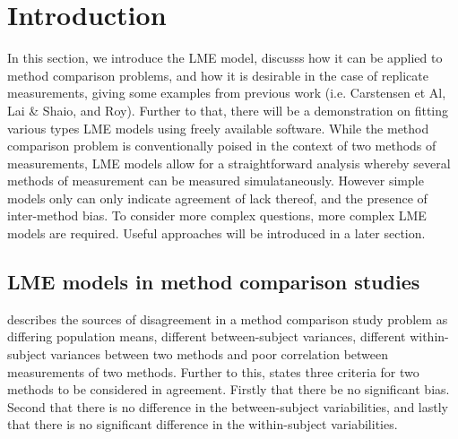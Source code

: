 \documentclass[12pt, a4paper]{report}
\theoremstyle{plain}
\theoremstyle{definition}
\theoremstyle{remark}
\begin{document}
	\newpage
	
	\section{Introduction}
	In this section, we introduce the LME model, discusss how it can be applied to method comparison problems, and how it is desirable in the case of replicate measurements, giving some examples from previous work (i.e. Carstensen et Al, Lai \& Shaio, and Roy). Further to that, there will be a demonstration on fitting various types LME models using freely available software.
	While the method comparison problem is conventionally poised in the context of two methods of measurements, LME models allow for a straightforward analysis whereby several methods of measurement can be measured simulataneously. However simple models only can only indicate agreement of lack thereof, and the presence of inter-method bias. To consider more complex questions, more complex LME models are required.  Useful approaches will be introduced in a later section.
	
	
	
	\subsection{LME models in method comparison studies}
	
	
	
	
	
	
	\citet{Barnhart} describes the sources of disagreement in a method comparison study problem as
	differing population means, different between-subject variances, different within-subject variances between two methods and poor
	correlation between measurements of two methods. Further to this, \citet{ARoy2009} states three criteria for two methods to be considered in agreement. Firstly that there be no significant bias. Second that there is no difference in the between-subject variabilities, and lastly that there is no significant difference in the within-subject variabilities. 	
	
\end{document}
